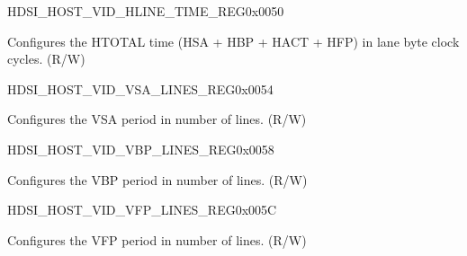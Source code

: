 \begin{register}{H}{DSI\_HOST\_VID\_HLINE\_TIME\_REG}{0x0050}\label{regdesc:DSIHOSTVIDHLINETIMEREG}
%
%
\regnewline%
\begin{regdesc}\begin{reglist}
\label{fielddesc:DSIHOSTVIDHLINETIME}\item [DSI\_HOST\_VID\_HLINE\_TIME] Configures the HTOTAL time (HSA + HBP + HACT + HFP) in lane byte clock cycles. (R/W)
\end{reglist}\end{regdesc}
\end{register}


\begin{register}{H}{DSI\_HOST\_VID\_VSA\_LINES\_REG}{0x0054}\label{regdesc:DSIHOSTVIDVSALINESREG}
%
%
\regnewline%
\begin{regdesc}\begin{reglist}
\label{fielddesc:DSIHOSTVSALINES}\item [DSI\_HOST\_VSA\_LINES] Configures the VSA period in number of lines. (R/W)
\end{reglist}\end{regdesc}
\end{register}


\begin{register}{H}{DSI\_HOST\_VID\_VBP\_LINES\_REG}{0x0058}\label{regdesc:DSIHOSTVIDVBPLINESREG}
%
%
\regnewline%
\begin{regdesc}\begin{reglist}
\label{fielddesc:DSIHOSTVBPLINES}\item [DSI\_HOST\_VBP\_LINES] Configures the VBP period in number of lines. (R/W)
\end{reglist}\end{regdesc}
\end{register}


\begin{register}{H}{DSI\_HOST\_VID\_VFP\_LINES\_REG}{0x005C}\label{regdesc:DSIHOSTVIDVFPLINESREG}
%
%
\regnewline%
\begin{regdesc}\begin{reglist}
\label{fielddesc:DSIHOSTVFPLINES}\item [DSI\_HOST\_VFP\_LINES] Configures the VFP period in number of lines. (R/W)
\end{reglist}\end{regdesc}
\end{register}


